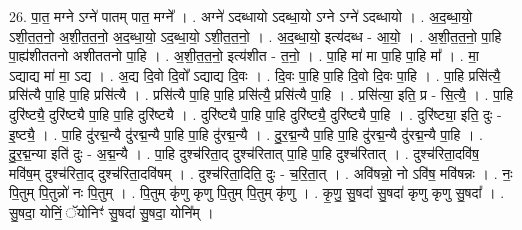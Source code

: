 \documentclass[17pt]{extarticle}
\begin{document}
26. पा॒त॒ मग्ने ऽग्ने॑ पातम् पात॒ मग्ने᳚ । . अग्ने॑ ऽदब्धायो ऽदब्धा॒यो ऽग्ने ऽग्ने॑ ऽदब्धायो । . अ॒द॒ब्धा॒यो॒ ऽशी॒त॒त॒नो॒ अ॒शी॒त॒त॒नो॒ अ॒द॒ब्धा॒यो॒ ऽद॒ब्धा॒यो॒ ऽशी॒त॒त॒नो॒ । . अ॒द॒ब्धा॒यो॒ इत्य॑दब्ध - आ॒यो॒ । . अ॒शी॒त॒त॒नो॒ पा॒हि पा॒ह्य॑शीततनो अशीततनो पा॒हि । . अ॒शी॒त॒त॒नो॒ इत्य॑शीत - त॒नो॒ । . पा॒हि मा॑ मा पा॒हि पा॒हि मा᳚ । . मा॒ ऽद्याद्य मा॑ मा॒ ऽद्य । . अ॒द्य दि॒वो दि॒वो᳚ ऽद्याद्य दि॒वः । . दि॒वः पा॒हि पा॒हि दि॒वो दि॒वः पा॒हि । . पा॒हि प्रसि॑त्यै॒ प्रसि॑त्यै पा॒हि पा॒हि प्रसि॑त्यै । . प्रसि॑त्यै पा॒हि पा॒हि प्रसि॑त्यै॒ प्रसि॑त्यै पा॒हि । . प्रसि॑त्या॒ इति॒ प्र - सि॒त्यै॒ । . पा॒हि दुरि॑ष्ट्यै॒ दुरि॑ष्ट्यै पा॒हि पा॒हि दुरि॑ष्ट्यै । . दुरि॑ष्ट्यै पा॒हि पा॒हि दुरि॑ष्ट्यै॒ दुरि॑ष्ट्यै पा॒हि । . दुरि॑ष्ट्या॒ इति॒ दुः - इ॒ष्ट्यै॒ । . पा॒हि दु॑रद्म॒न्यै दु॑रद्म॒न्यै पा॒हि पा॒हि दु॑रद्म॒न्यै । . दु॒र॒द्म॒न्यै पा॒हि पा॒हि दु॑रद्म॒न्यै दु॑रद्म॒न्यै पा॒हि । . दु॒र॒द्म॒न्या इति॑ दुः - अ॒द्म॒न्यै । . पा॒हि दुश्च॑रिता॒द् दुश्च॑रितात् पा॒हि पा॒हि दुश्च॑रितात् । . दुश्च॑रिता॒दवि॑ष॒ मवि॑ष॒म् दुश्च॑रिता॒द् दुश्च॑रिता॒दवि॑षम् । . दुश्च॑रिता॒दिति॒ दुः - च॒रि॒ता॒त् । . अवि॑षन्नो॒ नो ऽवि॑ष॒ मवि॑षन्नः । . नः॒ पि॒तुम् पि॒तुन्नो॑ नः पि॒तुम् । . पि॒तुम् कृ॑णु कृणु पि॒तुम् पि॒तुम् कृ॑णु । . कृ॒णु॒ सु॒षदा॑ सु॒षदा॑ कृणु कृणु सु॒षदा᳚ । . सु॒षदा॒ योनिं॒ ॅयोनिꣳ॑ सु॒षदा॑ सु॒षदा॒ योनि᳚म् । \newline
\end{document}
